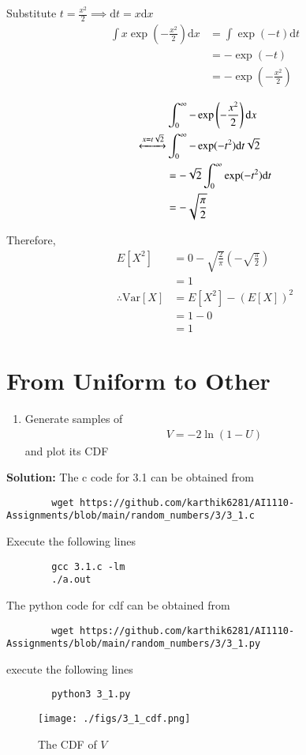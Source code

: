\documentclass[journal,12pt,twocolumn]{IEEEtran}
\newcommand{\solution}{\noindent \textbf{Solution: }}
\providecommand{\brak}[1]{\ensuremath{\left(#1\right)}}
\providecommand{\mean}[1]{E\left[ #1 \right]}
\providecommand{\var}[1]{\mathrm{Var}\left[ #1 \right]}
\providecommand{\der}[1]{\mathrm{d} #1}
\numberwithin{equation}{section}
\renewcommand\thesection{\arabic{section}}
\begin{document}
\begin{enumerate}[label=\thesection.\arabic*,ref=\thesection.\theenumi]
\begin{enumerate}[label=\thesection.\arabic*,ref=\thesection.\theenumi]
	Substitute $t = \frac{x^2}{2} \implies \der{t} = x\der{x}$
	\begin{align}
		\int x \exp\brak{-\frac{x^2}{2}} \der{x} &= \int \exp(-t) \der{t} \\
		&= - \exp(-t) \\
		&= - \exp\brak{-\frac{x^2}{2}}
	\end{align}
	
	\begin{align}
		&\int_0^{\infty} - \exp\brak{-\frac{x^2}{2}} \der{x} \\
		\xleftrightarrow{x = t\sqrt{2}} &\int_0^{\infty} -\exp(-t^2) \der{t}\sqrt{2} \\
		&= -{\sqrt{2}} \int_0^{\infty} \exp(-t^2) \der{t} \\
		&= - \sqrt{\frac{\pi}{2}}
	\end{align}
	
	Therefore,
	\begin{align}
		\mean{X^2} &= 0 - \sqrt{\frac{2}{\pi}} \brak{- \sqrt{\frac{\pi}{2}}} \\
		&= 1 \\
		\therefore \var{X} &= \mean{X^2} - \brak{\mean{X}}^2 \\
		&= 1 - 0 \\
		&= 1
	\end{align}
	\end{enumerate}
	
	\section{From Uniform to Other}
	\begin{enumerate}[label=\thesection.\arabic*,ref=\thesection.\theenumi]
	\item Generate samples of 
	\begin{align}
		V = -2\ln\brak{1-U}
	\end{align}
	and plot its CDF
	\end{enumerate}
	\solution The c code for 3.1 can be obtained from
	\begin{lstlisting}
		wget https://github.com/karthik6281/AI1110-Assignments/blob/main/random_numbers/3/3_1.c
	\end{lstlisting}
	Execute the following lines
	\begin{lstlisting}
		gcc 3.1.c -lm
		./a.out
	\end{lstlisting}
	The python code for cdf can be obtained from
	\begin{lstlisting}
		wget https://github.com/karthik6281/AI1110-Assignments/blob/main/random_numbers/3/3_1.py
	\end{lstlisting}
	execute the following lines
	\begin{lstlisting}
		python3 3_1.py
	\end{lstlisting}
	\begin{figure}
		\centering
		\texttt{[image: ./figs/3\_1\_cdf.png]}
		\caption{The CDF of $V$}
		\label{fig-3.1}
	\end{figure}	
	

\end{enumerate}
\end{document}
